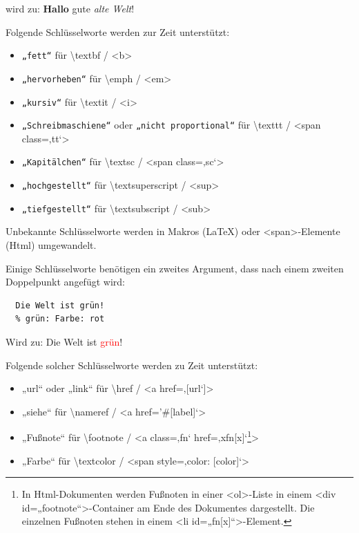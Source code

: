 \documentclass{scrartcl}
\begin{document}
{wird zu:
\textbf{Hallo} gute \emph{alte Welt}!\\}

{Folgende Schlüsselworte werden zur Zeit unterstützt:\\}

\begin{itemize}
\item \texttt{„fett“} für \textbackslash textbf / <b>
\item \texttt{„hervorheben“} für \textbackslash emph / <em>
\item \texttt{„kursiv“} für \textbackslash textit / <i>
\item \texttt{„Schreibmaschiene“} oder \texttt{„nicht proportional“} für \textbackslash texttt / <span class=‚tt‘>
\item \texttt{„Kapitälchen“} für \textbackslash textsc / <span class=‚sc‘>
\item \texttt{„hochgestellt“} für \textbackslash textsuperscript / <sup>
\item \texttt{„tiefgestellt“} für \textbackslash textsubscript / <sub>
\end{itemize}


{Unbekannte Schlüsselworte werden in Makros (LaTeX) oder
<span>-Elemente (Html) umgewandelt.\\}

{Einige Schlüsselworte benötigen ein zweites Argument, dass
nach einem zweiten Doppelpunkt angefügt wird:\\}

\begin{verbatim}
  Die Welt ist grün!
  % grün: Farbe: rot
\end{verbatim}


{Wird zu:
Die Welt ist \textcolor{red}{grün}!\\}

{Folgende solcher Schlüsselworte werden zu Zeit unterstützt:\\}

\begin{itemize}
\item „url“ oder „link“ für \textbackslash href / <a href=‚{[url‘]}>
\item „siehe“ für \textbackslash nameref / <a href='\#{[label]}‘> 
\item „Fußnote“ für  \textbackslash footnote / <a class=‚fn‘ href=‚xfn{[x]}‘\footnote{In Html-Dokumenten werden Fußnoten in einer <ol>-Liste in einem <div id=„footnote“>-Container am Ende des Dokumentes dargestellt. Die einzelnen Fußnoten stehen in einem <li id=„fn{[x]}“>-Element.}\xspace >
\item „Farbe“ für \textbackslash textcolor / <span style=‚color: {[color]}‘>
\end{itemize}
\end{document}
